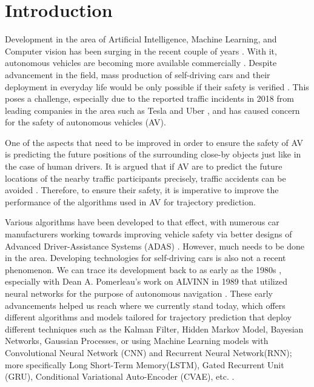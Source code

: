 \chapter{Introduction} 

\tab Development in the area of Artificial Intelligence, Machine Learning, and Computer vision has been surging in the recent couple of years \cite{8793868}. With it, autonomous vehicles are becoming more available commercially \cite{2019itsc_grip}.  Despite advancement in the field, mass production of self-driving cars and their deployment in everyday life would be only possible if their safety is verified \cite{9756903}. This poses a challenge, especially due to the reported traffic incidents in 2018 from leading companies in the area such as Tesla and Uber \cite{2019itsc_grip}, and has caused concern for the safety of autonomous vehicles (AV). 

\tab One of the aspects that need to be improved in order to ensure the safety of AV is predicting the future positions of the surrounding close-by objects \cite{9756903} just like in the case of human drivers. It is argued that if AV are to predict the future locations of the nearby traffic participants precisely, traffic accidents can be avoided \cite{2019itsc_grip}. Therefore, to ensure their safety, it is imperative to improve the performance of the algorithms used in AV for trajectory prediction.

\tab Various algorithms have been developed to that effect, with numerous car manufacturers working towards improving vehicle safety via better designs of Advanced Driver-Assistance Systems (ADAS) \cite{8793868}. However, much needs to be done in the area. Developing technologies for self-driving cars is also not a recent phenomenon. We can trace its development back to as early as the 1980s \cite{8793868}, especially with Dean A. Pomerleau's work on ALVINN in 1989 that utilized neural networks for the purpose of autonomous navigation \cite{Pomerleau-1989-15721}. These early advancements helped us reach where we currently stand today, which offers different algorithms and models tailored for trajectory prediction that deploy different techniques such as the Kalman Filter, Hidden Markov Model, Bayesian Networks, Gaussian Processes, or using Machine Learning models with Convolutional Neural Network (CNN) and Recurrent Neural Network(RNN); more specifically Long Short-Term Memory(LSTM), Gated Recurrent Unit (GRU), Conditional Variational Auto-Encoder (CVAE), etc. \cite{8793868}.

